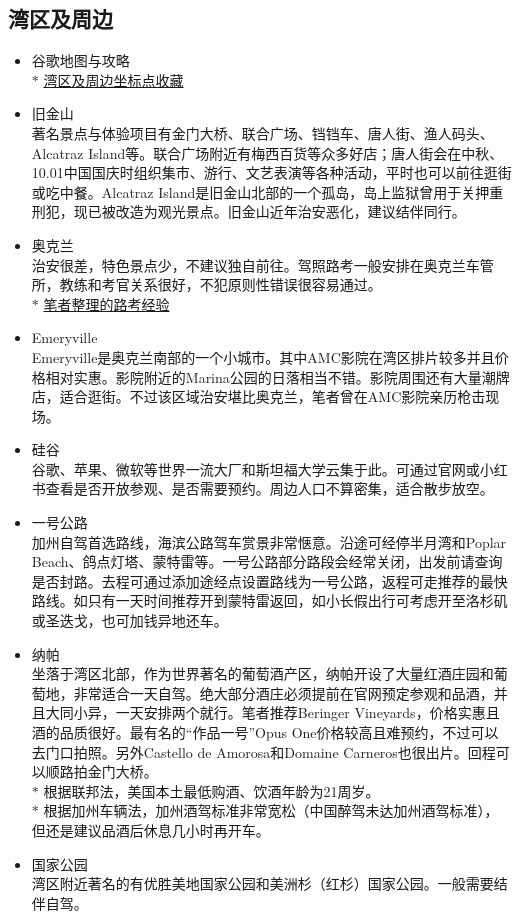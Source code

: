 \subsection{湾区及周边}
    \begin{itemize}
        \item 谷歌地图与攻略 \\
        $\ast$ \href{https://maps.app.goo.gl/4eEPoS2CreDBuatw7}{湾区及周边坐标点收藏}
        \item 旧金山 \\
        著名景点与体验项目有金门大桥、联合广场、铛铛车、唐人街、渔人码头、Alcatraz Island等。联合广场附近有梅西百货等众多好店；唐人街会在中秋、10.01中国国庆时组织集市、游行、文艺表演等各种活动，平时也可以前往逛街或吃中餐。Alcatraz Island是旧金山北部的一个孤岛，岛上监狱曾用于关押重刑犯，现已被改造为观光景点。旧金山近年治安恶化，建议结伴同行。
        \item 奥克兰 \\
        治安很差，特色景点少，不建议独自前往。驾照路考一般安排在奥克兰车管所，教练和考官关系很好，不犯原则性错误很容易通过。\\
        \quad $\ast$ \href{https://luyang-yu.notion.site/Oakland-Coliseum-f32d2dcbb91f44a5bd5a20ff099e454a?pvs=4}{笔者整理的路考经验}
        \item Emeryville \\
        Emeryville是奥克兰南部的一个小城市。其中AMC影院在湾区排片较多并且价格相对实惠。影院附近的Marina公园的日落相当不错。影院周围还有大量潮牌店，适合逛街。不过该区域治安堪比奥克兰，笔者曾在AMC影院亲历枪击现场。
        \item 硅谷 \\
        谷歌、苹果、微软等世界一流大厂和斯坦福大学云集于此。可通过官网或小红书查看是否开放参观、是否需要预约。周边人口不算密集，适合散步放空。
        \item 一号公路 \\
        加州自驾首选路线，海滨公路驾车赏景非常惬意。沿途可经停半月湾和Poplar Beach、鸽点灯塔、蒙特雷等。一号公路部分路段会经常关闭，出发前请查询是否封路。去程可通过添加途经点设置路线为一号公路，返程可走推荐的最快路线。如只有一天时间推荐开到蒙特雷返回，如小长假出行可考虑开至洛杉矶或圣迭戈，也可加钱异地还车。
        \item 纳帕 \\
        坐落于湾区北部，作为世界著名的葡萄酒产区，纳帕开设了大量红酒庄园和葡萄地，非常适合一天自驾。绝大部分酒庄必须提前在官网预定参观和品酒，并且大同小异，一天安排两个就行。笔者推荐Beringer Vineyards，价格实惠且酒的品质很好。最有名的“作品一号”Opus One价格较高且难预约，不过可以去门口拍照。另外Castello de Amorosa和Domaine Carneros也很出片。回程可以顺路拍金门大桥。 \\
        $\ast$   根据联邦法，美国本土最低购酒、饮酒年龄为21周岁。 \\
        $\ast$   根据加州车辆法，加州酒驾标准非常宽松（中国醉驾未达加州酒驾标准），但还是建议品酒后休息几小时再开车。
        \item 国家公园 \\
        湾区附近著名的有优胜美地国家公园和美洲杉（红杉）国家公园。一般需要结伴自驾。
    \end{itemize}

